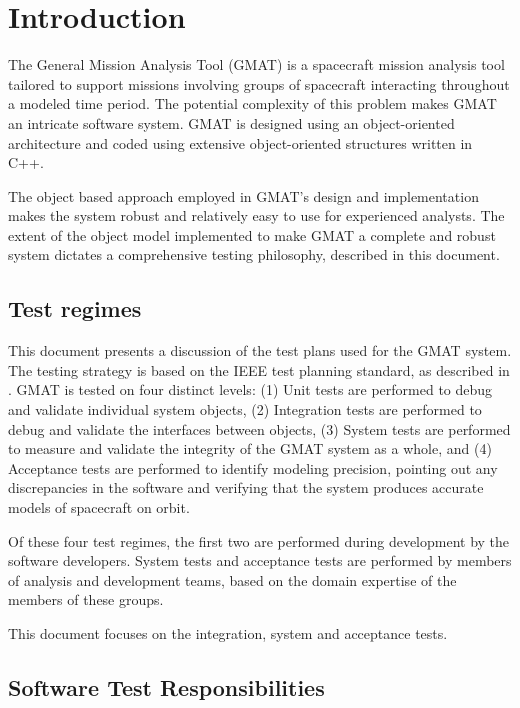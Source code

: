 \chapter{Introduction}


The General Mission Analysis Tool (GMAT) is a spacecraft mission analysis tool tailored to support
missions involving groups of spacecraft interacting throughout a modeled time period.  The
potential complexity of this problem makes GMAT an intricate software system.  GMAT is designed
using an object-oriented architecture\cite{GDT} and coded using extensive object-oriented
structures written in C++.

The object based approach employed in GMAT's design and implementation makes the system robust and
relatively easy to use for experienced analysts.  The extent of the object model implemented to
make GMAT a complete and robust system dictates a comprehensive testing philosophy, described in
this document.

\section{Test regimes}

This document presents a discussion of the test plans used for the GMAT system.  The testing
strategy is based on the IEEE test planning standard, as described in \cite{Craig}.  GMAT is tested on four distinct levels: (1) Unit tests are performed to debug and validate individual system
objects, (2) Integration tests are performed to debug and validate the interfaces between objects,
(3) System tests are performed to measure and validate the integrity of the GMAT system as a whole, and (4) Acceptance tests are performed to identify modeling precision, pointing out any
discrepancies in the software and verifying that the system produces accurate models of spacecraft
on orbit.

Of these four test regimes, the first two are performed during development by the software developers.  System tests and acceptance tests are performed by members of analysis and development teams, based on the domain expertise of the members of these groups.

This document focuses on the integration, system and acceptance tests.  

\section{Software Test Responsibilities}

